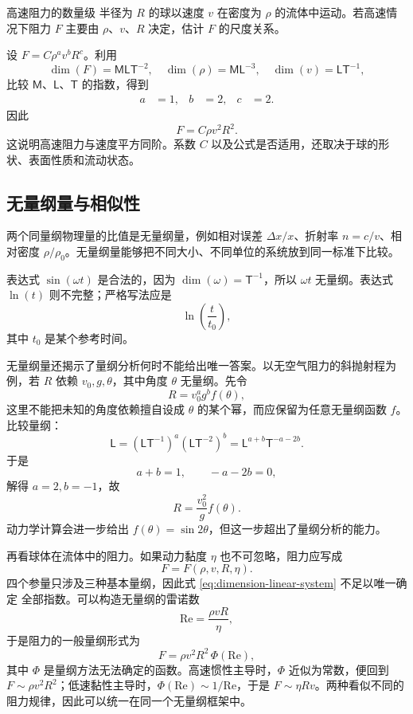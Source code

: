\documentclass[UTF8,zihao=-4,oneside,openany]{ctexbook}
\numberwithin{equation}{section}
\newcommand{\dimens}[1]{\operatorname{dim}\!\left(#1\right)}
\begin{document}
\begin{examplebox}{高速阻力的数量级}
半径为 $R$ 的球以速度 $v$ 在密度为 $\rho$ 的流体中运动。若高速情况下阻力 $F$ 主要由 $\rho$、$v$、$R$ 决定，估计 $F$ 的尺度关系。

\tcblower
设 $F=C\rho^a v^bR^c$。利用
\[
  \dimens{F}=\mathsf{MLT}^{-2},\quad
  \dimens{\rho}=\mathsf{ML}^{-3},\quad
  \dimens{v}=\mathsf{LT}^{-1},
\]
比较 $\mathsf{M}$、$\mathsf{L}$、$\mathsf{T}$ 的指数，得到
\[
  \begin{aligned}
    a&=1, & b&=2, & c&=2.
  \end{aligned}
\]
因此
\[
  F=C\rho v^2R^2.
\]
这说明高速阻力与速度平方同阶。系数 $C$ 以及公式是否适用，还取决于球的形状、表面性质和流动状态。
\end{examplebox}

\subsection{无量纲量与相似性}

两个同量纲物理量的比值是无量纲量，例如相对误差 $\Delta x/x$、折射率 $n=c/v$、相对密度 $\rho/\rho_0$。无量纲量能够把不同大小、不同单位的系统放到同一标准下比较。

表达式 $\sin(\omega t)$ 是合法的，因为 $\dimens{\omega}=\mathsf{T}^{-1}$，所以 $\omega t$ 无量纲。表达式 $\ln(t)$ 则不完整；严格写法应是
\[
  \ln\!\left(\frac{t}{t_0}\right),
\]
其中 $t_0$ 是某个参考时间。

无量纲量还揭示了量纲分析何时不能给出唯一答案。以无空气阻力的斜抛射程为例，若
$R$ 依赖 $v_0,g,\theta$，其中角度 $\theta$ 无量纲。先令
\[
  R=v_0^a g^b f(\theta),
\]
这里不能把未知的角度依赖擅自设成 $\theta$ 的某个幂，而应保留为任意无量纲函数
$f$。比较量纲：
\[
  \mathsf L=(\mathsf{LT}^{-1})^a(\mathsf{LT}^{-2})^b
  =\mathsf L^{a+b}\mathsf T^{-a-2b}.
\]
于是
\[
  a+b=1,\qquad -a-2b=0,
\]
解得 $a=2,b=-1$，故
\begin{equation}
  R=\frac{v_0^2}{g}f(\theta).
  \label{eq:projectile-dimensional-form}
\end{equation}
动力学计算会进一步给出 $f(\theta)=\sin 2\theta$，但这一步超出了量纲分析的能力。

再看球体在流体中的阻力。如果动力黏度 $\eta$ 也不可忽略，阻力应写成
\[
  F=F(\rho,v,R,\eta).
\]
四个参量只涉及三种基本量纲，因此式 \eqref{eq:dimension-linear-system} 不足以唯一确定
全部指数。可以构造无量纲的雷诺数
\[
  \mathrm{Re}=\frac{\rho vR}{\eta},
\]
于是阻力的一般量纲形式为
\begin{equation}
  F=\rho v^2R^2\,\Phi(\mathrm{Re}),
  \label{eq:drag-dimensionless-form}
\end{equation}
其中 $\Phi$ 是量纲方法无法确定的函数。高速惯性主导时，$\Phi$ 近似为常数，便回到
$F\sim\rho v^2R^2$；低速黏性主导时，$\Phi(\mathrm{Re})\sim1/\mathrm{Re}$，于是
$F\sim\eta Rv$。两种看似不同的阻力规律，因此可以统一在同一个无量纲框架中。
\end{document}
